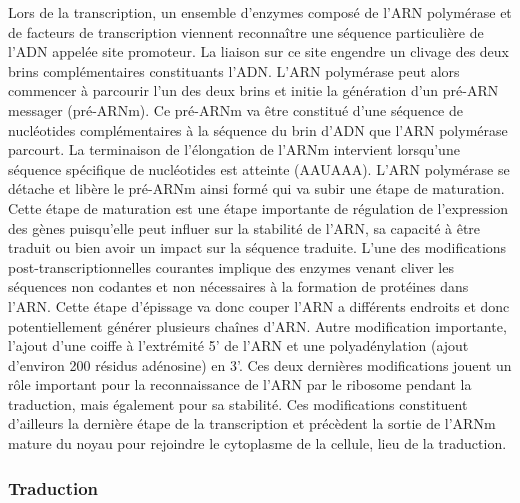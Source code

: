 Lors de la transcription, un ensemble d'enzymes composé de l'ARN polymérase et de facteurs de transcription viennent reconnaître une séquence particulière de l'ADN appelée site promoteur. La liaison sur ce site engendre un clivage des deux brins complémentaires constituants l'ADN. L'ARN polymérase peut alors commencer à parcourir l'un des deux brins et initie la génération d'un pré-ARN messager (pré-ARNm). Ce pré-ARNm va être constitué d'une séquence de nucléotides complémentaires à la séquence du brin d'ADN que l'ARN polymérase parcourt. La terminaison de l'élongation de l'ARNm intervient lorsqu’une séquence spécifique de nucléotides est atteinte (AAUAAA). L'ARN polymérase se détache et libère le pré-ARNm ainsi formé qui va subir une étape de maturation. Cette étape de maturation est une étape importante de régulation de l'expression des gènes puisqu'elle peut influer sur la stabilité de l'ARN, sa capacité à être traduit ou bien avoir un impact sur la séquence traduite. L'une des modifications post-transcriptionnelles courantes implique des enzymes venant cliver les séquences non codantes et non nécessaires à la formation de protéines dans l'ARN. Cette étape d'épissage va donc couper l'ARN a différents endroits et donc potentiellement générer plusieurs chaînes d'ARN. Autre modification importante, l'ajout d'une coiffe à l'extrémité 5' de l'ARN et une polyadénylation (ajout d'environ 200 résidus adénosine) en 3'. Ces deux dernières modifications jouent un rôle important pour la reconnaissance de l'ARN par le ribosome pendant la traduction, mais également pour sa stabilité. Ces modifications constituent d'ailleurs la dernière étape de la transcription et précèdent la sortie de l'ARNm mature du noyau pour rejoindre le cytoplasme de la cellule, lieu de la traduction.

\subsubsection{Traduction}

